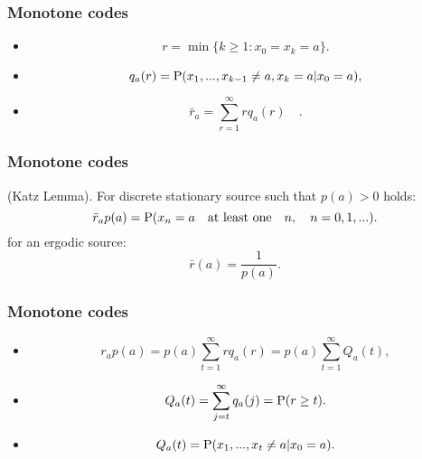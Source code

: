 \documentclass[14pt]{beamer}
\begin{document}
\begin{frame}
\frametitle{Monotone codes}
\begin{itemize}    

    \item
    \begin{equation}
    \label{eq4_12} r = \min \{k \ge 1:x_0 = x_k = a\}.
    \end{equation}
    
    \item    
    \begin{equation}
    \label{eq4_13} q_a (r) = {\rm P}(x_1 ,...,x_{k - 1} \ne a,x_k = a\vert x_0 = a),
    \end{equation}
    
    \item 
    \begin{equation}
    \label{eq4_14} \bar {r}_a = \sum\limits_{r = 1}^\infty {rq_a (r)}
    \quad.
    \end{equation}

\end{itemize}
\end{frame}


\begin{frame}
\frametitle{Monotone codes}
   

    \begin{lemma}(Katz Lemma).
    For discrete stationary source such that $p(a) > 0$ holds:
    \begin{equation}
    \label{eq4_15} \bar {r}_a p(a) = {\rm P}(x_n = a\quad \mbox{at least one} \quad n, \quad n = 0,1,...).
    \end{equation}
    for an ergodic source:
    \begin{equation}
    \label{eq4_16} \bar {r}(a) = \frac{1}{p(a)}.
    \end{equation}
    \end{lemma}
\end{frame}



\begin{frame}
\frametitle{Monotone codes}
\begin{itemize}    


    \item
    \begin{equation}
    \label{eq4_17} r_a p(a) = p(a)\sum\limits_{t = 1}^\infty {rq_a (r) = } p(a)\sum\limits_{t = 1}^\infty {Q_a (t)} ,
    \end{equation}
    
    \item
    \[
    Q_a (t) = \sum\limits_{j = t}^\infty {q_a (j) = {\rm P}(r \ge t).}
    \]

    \item
    \[
    Q_a (t) = {\rm P}(x_1 ,...,x_t \ne a\vert x_0 = a).
    \]

\end{itemize}
\end{frame}
\end{document}
